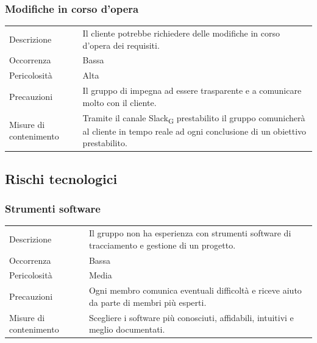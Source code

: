 \documentclass{article}
\begin{document}
\subsubsection{Modifiche in corso d'opera}
\begin{center}
\begin{tabular}{P{10em} P{20em}} 
     Descrizione & Il cliente potrebbe richiedere delle modifiche in corso d'opera dei requisiti.\\ 
    Occorrenza & Bassa\\
    Pericolosità & Alta \\
    Precauzioni & Il gruppo di impegna ad essere trasparente e a comunicare molto con il cliente. \\
    Misure di contenimento & Tramite il canale Slack\textsubscript{G} prestabilito il gruppo comunicherà al cliente in tempo reale ad ogni conclusione di un obiettivo prestabilito. \\
\end{tabular}
\label{tab:modifiche}
\end{center}

\subsection{Rischi tecnologici}
\subsubsection{Strumenti software}
\begin{center}
\begin{tabular}{P{10em} P{20em}} 
     Descrizione & Il gruppo non ha esperienza con strumenti software di tracciamento e gestione di un progetto.\\ 
    Occorrenza & Bassa\\
    Pericolosità & Media \\
    Precauzioni & Ogni membro comunica eventuali difficoltà e riceve aiuto da parte di membri più esperti. \\
    Misure di contenimento & Scegliere i software più conosciuti, affidabili, intuitivi e meglio documentati. \\
\end{tabular}
\label{tab:sofrware}
\end{center}
\end{document}
